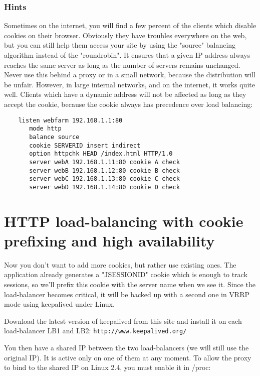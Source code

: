 \subsubsection{Hints}

Sometimes on the internet, you will find a few percent of the clients which
disable cookies on their browser. Obviously they have troubles everywhere on
the web, but you can still help them access your site by using the "source"
balancing algorithm instead of the "roundrobin". It ensures that a given IP
address always reaches the same server as long as the number of servers remains
unchanged. Never use this behind a proxy or in a small network, because the
distribution will be unfair. However, in large internal networks, and on the
internet, it works quite well. Clients which have a dynamic address will not
be affected as long as they accept the cookie, because the cookie always has
precedence over load balancing:

\begin{verbatim}
    listen webfarm 192.168.1.1:80
       mode http
       balance source
       cookie SERVERID insert indirect
       option httpchk HEAD /index.html HTTP/1.0
       server webA 192.168.1.11:80 cookie A check
       server webB 192.168.1.12:80 cookie B check
       server webC 192.168.1.13:80 cookie C check
       server webD 192.168.1.14:80 cookie D check
\end{verbatim}

\section{HTTP load-balancing with cookie prefixing and high availability}

Now you don't want to add more cookies, but rather use existing ones. The
application already generates a "JSESSIONID" cookie which is enough to track
sessions, so we'll prefix this cookie with the server name when we see it.
Since the load-balancer becomes critical, it will be backed up with a second
one in VRRP mode using keepalived under Linux.

Download the latest version of keepalived from this site and install it
on each load-balancer LB1 and LB2:
\verb|http://www.keepalived.org/|

You then have a shared IP between the two load-balancers (we will still use the
original IP). It is active only on one of them at any moment. To allow the
proxy to bind to the shared IP on Linux 2.4, you must enable it in /proc:

